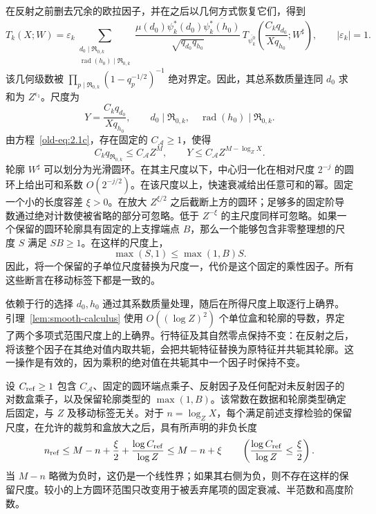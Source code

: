 \documentclass[11pt,a4paper]{article}
\numberwithin{equation}{section}
\numberwithin{figure}{section}
\theoremstyle{definition}
\theoremstyle{remark}
\begin{document}
在反射之前删去冗余的欧拉因子，并在之后以几何方式恢复它们，得到
\[
 T_k(X;W)
 =\varepsilon_k
 \sum_{\substack{d_0\mid\mathfrak R_{0,k}\\
                  \operatorname{rad}(h_0)\mid\mathfrak R_{0,k}}}
 \frac{\mu(d_0)\psi_k^*(d_0)\overline{\psi_k^*(h_0)}}
      {\sqrt{q_{d_0}q_{h_0}}}\,
 T_{\overline{\psi_k^0}}
   \left(\frac{C_kq_{d_0}}{Xq_{h_0}};W^\sharp\right),
 \qquad |\varepsilon_k|=1.
\]
该几何级数被 \(\prod_{p\mid\mathfrak R_{0,k}}(1-q_p^{-1/2})^{-1}\) 绝对界定。因此，其总系数质量连同 \(d_0\) 求和为 \(Z^{\epsilon_1}\)。尺度为
\begin{equation}
 Y=\frac{C_kq_{d_0}}{Xq_{h_0}},\qquad
 d_0\mid\mathfrak R_{0,k},\quad
 \operatorname{rad}(h_0)\mid\mathfrak R_{0,k}.
 \label{old-eq:2.1d}
\end{equation}
由方程~\eqref{old-eq:2.1c}，存在固定的 \(C_{\mathcal A}\ge1\)，使得
\[
 C_kq_{\mathfrak R_{0,k}}\le C_{\mathcal A}Z^M,\qquad
 Y\le C_{\mathcal A}Z^{M-\log_ZX}.
\]轮廓 \(W^\sharp\) 可以划分为光滑圆环。在其主尺度以下，中心归一化在相对尺度 \(2^{-j}\) 的圆环上给出可和系数 \(O(2^{-j/2})\)。在该尺度以上，快速衰减给出任意可和的幂。固定一个小的长度容差 \(\xi>0\)。在放大 \(Z^{\xi/2}\) 之后截断上方的圆环；足够多的固定阶导数通过绝对计数使被省略的部分可忽略。低于 \(Z^{-\xi}\) 的主尺度同样可忽略。如果一个保留的圆环轮廓具有固定的上支撑端点 \(B\)，那么一个能够包含非零整理想的尺度 \(S\) 满足 \(SB\ge1\)。在这样的尺度上，
\[
 \max(S,1)\le\max(1,B)S.
\]
因此，将一个保留的子单位尺度替换为尺度一，代价是这个固定的乘性因子。所有这些断言在移动标签下都是一致的。

依赖于行的选择 \(d_0,h_0\) 通过其系数质量处理，随后在所得尺度上取逐行上确界。引理~\ref{lem:smooth-calculus} 使用 \(O((\log Z)^2)\) 个单位盒和轮廓的导数，界定了两个多项式范围尺度上的上确界。行特征及其自然零点保持不变：在反射之后，将该整个因子在其绝对值内取共轭，会把共轭特征替换为原特征并共轭其轮廓。这一操作是有效的，因为乘积的绝对值在共轭其中一个因子时保持不变。

设 \(C_{\rm ref}\ge1\) 包含 \(C_{\mathcal A}\)、固定的圆环端点乘子、反射因子及任何配对未反射因子的对数盒乘子，以及保留轮廓类型的 \(\max(1,B)\)。该常数在数据和轮廓类型确定后固定，与 \(Z\) 及移动标签无关。对于 \(n=\log_ZX\)，每个满足前述支撑检验的保留尺度，在允许的裁剪和盒放大之后，具有所声明的非负长度
\begin{equation}
 n_{\rm ref}\le M-n+\frac\xi2+\frac{\log C_{\rm ref}}{\log Z}
 \le M-n+\xi
 \qquad\left(\frac{\log C_{\rm ref}}{\log Z}\le\frac\xi2\right).
 \label{eq:centered-reflection-length}
\end{equation}
当 \(M-n\) 略微为负时，这仍是一个线性界；如果其右侧为负，则不存在这样的保留尺度。较小的上方圆环范围只改变用于被丢弃尾项的固定衰减、半范数和高度阶数。
\end{document}
